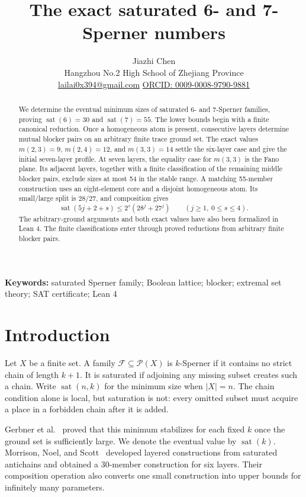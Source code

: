 \documentclass[11pt]{article}
\title{The exact saturated 6- and 7-Sperner numbers}
\author{Jiazhi Chen\\
\small Hangzhou No.2 High School of Zhejiang Province\\
\small \href{mailto:lailai0x394@gmail.com}{lailai0x394@gmail.com}\quad
\href{https://orcid.org/0009-0008-9790-9881}{ORCID: 0009-0008-9790-9881}}
\date{}
\theoremstyle{definition}
\theoremstyle{remark}
\newcommand{\powerset}{\mathcal{P}}
\newcommand{\family}{\mathcal{F}}
\newcommand{\sat}{\operatorname{sat}}
\begin{document}
\pagestyle{plain}
\maketitle

\begin{abstract}
We determine the eventual minimum sizes of saturated 6- and 7-Sperner
families, proving $\sat(6)=30$ and $\sat(7)=55$.  The lower bounds begin with
a finite canonical reduction.  Once a homogeneous atom is present,
consecutive layers determine mutual blocker pairs on an arbitrary finite
trace ground set.  The exact values $m(2,3)=9$, $m(2,4)=12$, and
$m(3,3)=14$ settle the six-layer case and give the initial seven-layer
profile.  At seven layers, the equality case for $m(3,3)$ is the Fano plane.
Its adjacent layers, together with a finite classification of the remaining
middle blocker pairs, exclude sizes at most 54 in the stable range.  A matching
55-member construction uses an eight-element core and a disjoint homogeneous
atom.  Its small/large split is $28/27$, and composition gives
\[
  \sat(5j+2+s)\leq 2^s(28^j+27^j)
  \qquad(j\geq1,\ 0\leq s\leq4).
\]
The arbitrary-ground arguments and both exact values have also been
formalized in Lean 4.  The finite classifications enter through proved
reductions from arbitrary finite blocker pairs.
\end{abstract}

\noindent\textbf{Keywords:} saturated Sperner family; Boolean lattice;
blocker; extremal set theory; SAT certificate; Lean 4

\section{Introduction}

Let $X$ be a finite set.  A family $\family\subseteq\powerset(X)$ is
$k$-Sperner if it contains no strict chain of length $k+1$.  It is saturated
if adjoining any missing subset creates such a chain.  Write $\sat(n,k)$ for
the minimum size when $|X|=n$.  The chain condition alone is local, but
saturation is not: every omitted subset must acquire a place in a forbidden
chain after it is added.

Gerbner et al.~\cite{gerbner2013} proved that this minimum stabilizes for each
fixed $k$ once the ground set is sufficiently large.  We denote the eventual
value by $\sat(k)$.  Morrison, Noel, and Scott~\cite{mns2014} developed
layered constructions from saturated antichains and obtained a 30-member
construction for six layers.  Their composition operation also converts one
small construction into upper bounds for infinitely many parameters.
\end{document}
